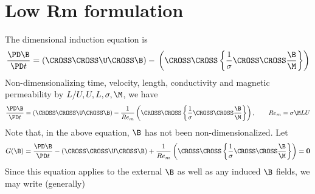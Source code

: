 \documentclass[11pt]{article}
\begin{document}
\doublespacing
\MOONSTITLE

\section{Low Rm formulation}
The dimensional induction equation is
\begin{equation}
  \frac{\PD \B}{\PD t}
  =
  (\CROSS \CROSS \U \CROSS \B)
  - \\
  \left(
  \CROSS \CROSS
  \left\{
  \frac{1}{\sigma}
  \CROSS \CROSS
  \frac{\B}{\M}
  \right\}
  \right)
\end{equation}
Non-dimensionalizing time, velocity, length, conductivity and magnetic permeability by $L/U,U,L,\sigma,\M$, we have
\begin{equation}
  \frac{\PD \B}{\PD t}
  =
  (\CROSS \CROSS \U \CROSS \B)
  - \\
  \frac{1}{Re_m}
  \left(
  \CROSS \CROSS
  \left\{
  \frac{1}{\sigma}
  \CROSS \CROSS
  \frac{\B}{\M}
  \right\}
  \right)
  ,\qquad Re_m = \sigma \M LU
\end{equation}
Note that, in the above equation, $\B$ has not been non-dimensionalized. Let
\begin{equation}
  G(\B)
  =
  \frac{\PD \B}{\PD t}
  -
  (\CROSS \CROSS \U \CROSS \B)
  +
  \frac{1}{Re_m}
  \left(
  \CROSS \CROSS
  \left\{
  \frac{1}{\sigma}
  \CROSS \CROSS
  \frac{\B}{\M}
  \right\}
  \right)
  =
  \mathbf{0}
\end{equation}
Since this equation applies to the external $\B$ as well as any induced $\B$ fields, we may write (generally)
\end{document}
